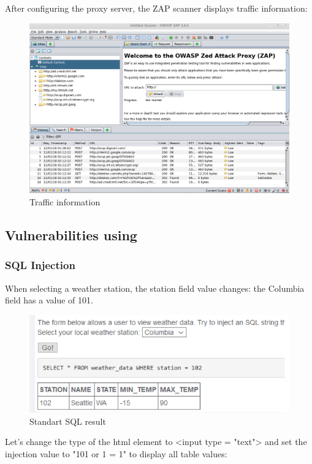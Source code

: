 \documentclass[14pt,a4paper,report]{report}
\begin{document}
After configuring the proxy server, the ZAP scanner displays traffic information:

\begin{figure}[h!]
	\centering
	\includegraphics[scale = 0.50]{images/5.png}
	\caption{Traffic information}
\end{figure}

\subsection{Vulnerabilities using}

\subsubsection{SQL Injection}

When selecting a weather station, the station field value changes: the Columbia field has a value of 101. 

\begin{figure}[h!]
	\centering
	\includegraphics[scale = 0.61]{images/6.png}
	\caption{Standart SQL result}
\end{figure}

Let's change the type of the html element to <input type = "text"> and set the injection value to "101 or 1 = 1" to display all table values:
\end{document}
